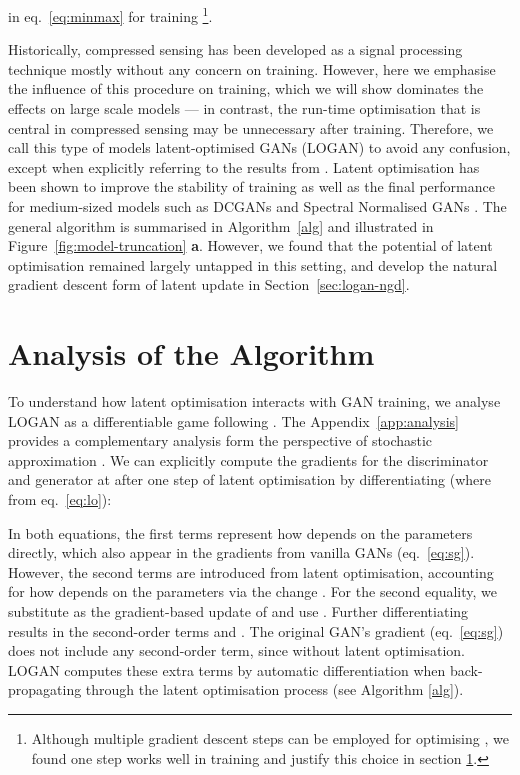 \documentclass{article} \usepackage{iclr2020_conference,times}
\begin{document}
in eq.~\ref{eq:minmax} for training \footnote{Although multiple gradient descent steps can be employed for optimising , we found one step works well in training and justify this choice in section \ref{sec:analysis}.}. 

Historically, compressed sensing has been developed as a signal processing technique mostly without any concern on training. However, here we emphasise the influence of this procedure on training, which we will show dominates the effects on large scale models --- in contrast, the run-time optimisation that is central in compressed sensing may be unnecessary after training. Therefore, we call this type of models latent-optimised GANs (LOGAN) to avoid any confusion, except when explicitly referring to the results from \cite{wu2019deep}. Latent optimisation has been shown to improve the stability of training as well as the final performance for medium-sized models such as DCGANs and Spectral Normalised GANs \citep{radford2015unsupervised,miyato2018spectral}. The general algorithm is summarised in Algorithm~\ref{alg} and illustrated in Figure~\ref{fig:model-truncation} \textbf{a}. However, we found that the potential of latent optimisation remained largely untapped in this setting, and develop the natural gradient descent form of latent update in Section~\ref{sec:logan-ngd}.

\section{Analysis of the Algorithm}
\label{sec:analysis}
To understand how latent optimisation interacts with GAN training, we analyse LOGAN as a differentiable game following \citet{balduzzi2018mechanics, gemp:18, letcher2019differentiable}.
The Appendix~\ref{app:analysis} provides a complementary analysis form the perspective of stochastic approximation \citep{heusel2017gans,borkar1997stochastic}. 
We can explicitly compute the gradients for the discriminator and generator at  after one step of latent optimisation by differentiating  (where  from eq.~\ref{eq:lo}):

In both equations, the first terms represent how  depends on the parameters directly, which also appear in the gradients from vanilla GANs (eq.~\ref{eq:sg}). However, the second terms are introduced from latent optimisation, accounting for how  depends on the parameters via the change . For the second equality, we substitute  as the gradient-based update of  and use .
Further differentiating  results in the second-order terms  and .
The original GAN's gradient (eq.~\ref{eq:sg}) does not include any second-order term, since  without latent optimisation. LOGAN computes these extra terms by automatic differentiation when back-propagating through the latent optimisation process (see Algorithm \ref{alg}). 
\end{document}
